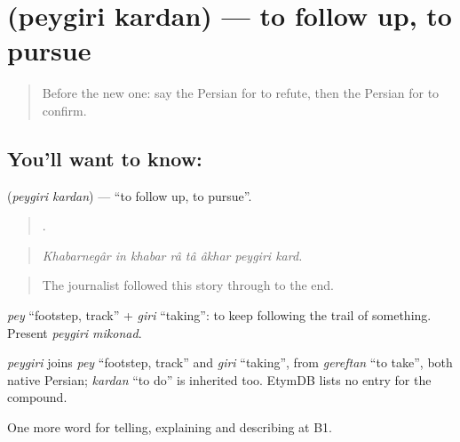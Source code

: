 \section[\texorpdfstring{\fa{پیگیری} \fa{کردن} (peygiri kardan)}{پیگیری کردن (peygiri kardan)}]{  (peygiri kardan) — to follow up, to pursue}

\label{lesson:FA-C310-peygiri-kardan}



\begin{quote}
Before the new one: say the Persian for to refute, then the Persian for to confirm.
\end{quote}

\subsection*{You'll want to know:  }
\textbf{ } (\emph{peygiri kardan}) — \textquotedblleft{}to follow up, to pursue\textquotedblright{}.

\begin{quote}
       .
\end{quote}

\begin{quote}
\emph{Khabarnegâr in khabar râ tâ âkhar peygiri kard.}
\end{quote}

\begin{quote}
The journalist followed this story through to the end.
\end{quote}

\emph{pey} \textquotedblleft{}footstep, track\textquotedblright{} + \emph{giri} \textquotedblleft{}taking\textquotedblright{}: to keep following the trail of something. Present \emph{peygiri mikonad}.

\begin{cousinweb}
\emph{peygiri} joins \emph{pey} \textquotedblleft{}footstep, track\textquotedblright{} and \emph{giri} \textquotedblleft{}taking\textquotedblright{}, from \emph{gereftan} \textquotedblleft{}to take\textquotedblright{}, both native Persian; \emph{kardan} \textquotedblleft{}to do\textquotedblright{} is inherited too. EtymDB lists no entry for the compound.
\end{cousinweb}

\begin{grammarlens}[title={What you've built}]
One more word for telling, explaining and describing at B1.
\end{grammarlens}

